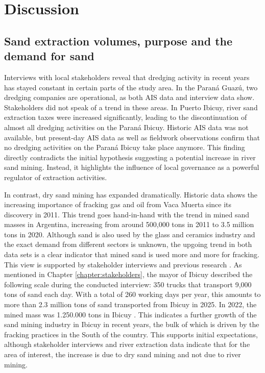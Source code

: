 \chapter{Discussion}

\section{Sand extraction volumes, purpose and the demand for sand}
Interviews with local stakeholders reveal that dredging activity in recent years has stayed constant in certain parts of the study area. In the Paraná Guazú, two dredging companies are operational, as both AIS data and interview data show. Stakeholders did not speak of a trend in these areas. In Puerto Ibicuy, river sand extraction taxes were increased significantly, leading to the discontinuation of almost all dredging activities on the Paraná Ibicuy. Historic AIS data was not available, but present-day AIS data as well as fieldwork observations confirm that no dredging activities on the Paraná Ibicuy take place anymore. This finding directly contradicts the initial hypothesis suggesting a potential increase in river sand mining. Instead, it highlights the influence of local governance as a powerful regulator of extraction activities.

In contrast, dry sand mining has expanded dramatically. Historic data shows the increasing importance of fracking gas and oil from Vaca Muerta since its discovery in 2011. This trend goes hand-in-hand with the trend in mined sand masses in Argentina, increasing from around 500,000 tons in 2011 to 3.5 million tons in 2020. Although sand is also used by the glass and ceramics industry and the exact demand from different sectors is unknown, the upgoing trend in both data sets is a clear indicator that mined sand is used more and more for fracking. This view is supported by stakeholder interviews and previous research \autocite{fogliaSedArena2023} \autocite{secretariadepoliticamineraArenasParaFracking2019}. As mentioned in Chapter \ref{chapter:stakeholders}, the mayor of Ibicuy described the following scale during the conducted interview: 350 trucks that transport 9,000 tons of sand each day. With a total of 260 working days per year, this amounts to more than 2.3 million tons of sand transported from Ibicuy in 2025. In 2022, the mined mass was 1.250.000 tons in Ibicuy \autocite{fogliaSedArena2023}. This indicates a further growth of the sand mining industry in Ibicuy in recent years, the bulk of which is driven by the fracking practices in the South of the country. This supports initial expectations, although stakeholder interviews and river extraction data indicate that for the area of interest, the increase is due to dry sand mining and not due to river mining. 

